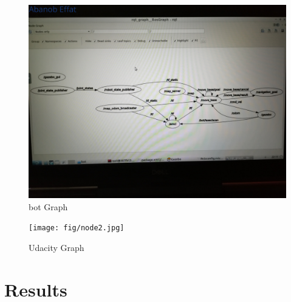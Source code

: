 \documentclass[10pt,journal,compsoc]{IEEEtran}
\begin{document}
\begin{figure}[thpb]
      \centering
      \includegraphics[width=\linewidth]{fig/node1.jpg}
      \caption{bot Graph}
\end{figure}
\begin{figure}[thpb]
      \centering
      \texttt{[image: fig/node2.jpg]}
      \caption{Udacity Graph}
\end{figure}

\section{Results}
\end{document}
